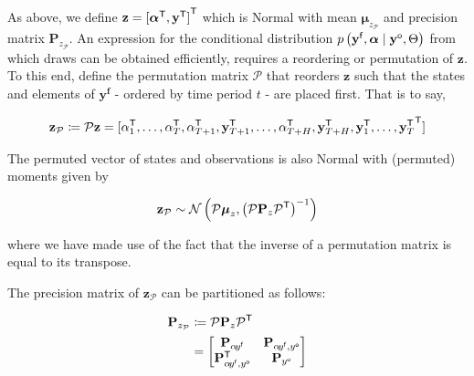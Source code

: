 \documentclass[notitlepage,a4paper,12pt]{article}
\newcommand{\transpose}[1]{{#1}^{\sf{T}}}
\begin{document}
As above, we define $\mathbf{z} = \transpose{[\transpose{\boldsymbol{\alpha}}, \transpose{\mathbf{y}}]}$ which is Normal with mean $\boldsymbol{\mu}_{z_\mathcal{P}}$ and precision matrix $\mathbf{P}_{z_\mathcal{P}}$. An expression for the conditional distribution $p\left(\mathbf{y}^{\sf{f}}, \boldsymbol{\alpha} \mid \mathbf{y}^{\sf{o}}, \Theta \right)$ from which draws can be obtained efficiently, requires a reordering or permutation of $\mathbf{z}$. To this end, define the permutation matrix $\mathcal{P}$ that reorders $\mathbf{z}$ such that the states and elements of $\mathbf{y^f}$ - ordered by time period $t$ - are placed first. That is to say,

$$
\mathbf{z_{\mathcal{P}}} \coloneqq \mathcal{P} \mathbf{z} =
 \transpose{[
     \alpha^{\sf{T}}_1, 
     \dots, 
     \alpha^{\sf{T}}_T, 
     \alpha^{\sf{T}}_{T+1}, 
     \mathbf{y}^{\sf{T}}_{T+1}, 
     \dots, 
     \alpha^{\sf{T}}_{T+H}, 
     \mathbf{y}^{\sf{T}}_{T+H},
     \mathbf{y}^{\sf{T}}_1,
     \dots,
     \mathbf{y}^{\sf{T}}_T}]
$$

The permuted vector of states and observations is also Normal with (permuted) moments given by 

\begin{equation*}
    \mathbf{z_{\mathcal{P}}} \sim \mathcal{N}\left(\mathcal{P}\boldsymbol{\mu}_z, \left(\mathcal{P} \mathbf{P}_z \transpose{\mathcal{P}}\right)^{-1}\right)
\end{equation*}

where we have made use of the fact that the inverse of a permutation matrix is equal to its transpose. 

The precision matrix of $\mathbf{z}_{\mathcal{P}}$ can be partitioned as follows: 

\begin{align*}
    \mathbf{P}_{z_{\mathcal{P}}} &\coloneqq  \mathcal{P} \mathbf{P}_z \transpose{\mathcal{P}} \\
    &= 
    \begin{bmatrix}
        \mathbf{P}_{\alpha\! y^{\sf{f}}} & \mathbf{P}_{\alpha\! y^{\sf{f}}, y^{\sf{o}}} \\ 
        \mathbf{P}^{\sf{T}}_{\alpha\! y^{\sf{f}}, y^{\sf{o}}} & \mathbf{P}_{y^{\sf{o}}}
    \end{bmatrix}
\end{align*}

\end{document}
